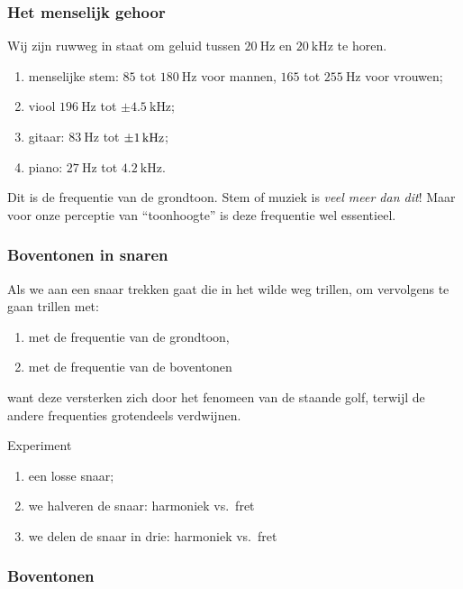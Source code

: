 \documentclass[compress, darktitle, framenumber, handout, totalframenumber]{beamer}
\begin{document}
\begin{frame}
  \frametitle{Het menselijk gehoor}

  Wij zijn ruwweg in staat om geluid tussen $\SI{20}{\hertz}$ en $\SI{20}{\kilo\hertz}$ te horen.
  \pause
  \begin{enumerate}
    \item menselijke stem: $85$ tot $\SI{180}{\hertz}$ voor mannen, $165$ tot $\SI{255}{\hertz}$ voor vrouwen;
    \pause\item viool $\SI{196}{\hertz}$ tot $\pm\SI{4.5}{\kilo\hertz}$;
    \pause\item gitaar: $\SI{83}{\hertz}$ tot $\SI{\pm 1}{\kilo\hertz}$;
    \pause\item piano: $\SI{27}{\hertz}$ tot $\SI{4.2}{\kilo\hertz}$.
  \end{enumerate}
  \pause
  Dit is de frequentie van de \alert{grondtoon}. Stem of muziek is \emph{veel meer dan dit}! Maar voor onze perceptie van ``toonhoogte'' is deze frequentie wel essentieel.
\end{frame}

\begin{frame}
  \frametitle{Boventonen in snaren}

  Als we aan een snaar trekken gaat die in het wilde weg trillen, om vervolgens te gaan trillen met:
  \begin{enumerate}
    \item met de frequentie van de grondtoon,
    \item met de frequentie van de boventonen
  \end{enumerate}
  want deze versterken zich door het fenomeen van de staande golf, terwijl de andere frequenties grotendeels verdwijnen.
  \pause
  \begin{block}{Experiment}
    \begin{enumerate}
      \item een losse snaar;
        \pause
      \item we halveren de snaar: harmoniek vs.\ fret
        \pause
      \item we delen de snaar in drie: harmoniek vs.\ fret
    \end{enumerate}
  \end{block}
\end{frame}

\begin{frame}
  \frametitle{Boventonen}

  \centering
\end{frame}
\end{document}
